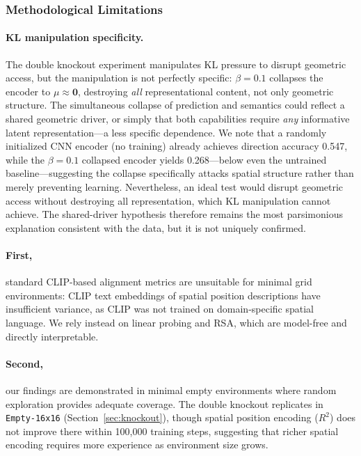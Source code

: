 \documentclass{article}
\begin{document}
\subsubsection*{Methodological Limitations}

\paragraph{KL manipulation specificity.}
The double knockout experiment manipulates KL pressure to disrupt
geometric access, but the manipulation is not perfectly specific:
$\beta=0.1$ collapses the encoder to $\mu\!\approx\!\mathbf{0}$,
destroying \emph{all} representational content, not only geometric structure.
The simultaneous collapse of prediction and semantics could reflect
a shared geometric driver, or simply that both capabilities require
\emph{any} informative latent representation---a less specific dependence.
We note that a randomly initialized CNN encoder (no training) already
achieves direction accuracy 0.547, while the $\beta=0.1$ collapsed
encoder yields 0.268---below even the untrained baseline---suggesting
the collapse specifically attacks spatial structure rather than
merely preventing learning.
Nevertheless, an ideal test would disrupt geometric access without
destroying all representation, which KL manipulation cannot achieve.
The shared-driver hypothesis therefore remains the most parsimonious
explanation consistent with the data, but it is not uniquely confirmed.

\paragraph{First,} standard CLIP-based alignment metrics are unsuitable for minimal
grid environments: CLIP text embeddings of spatial position descriptions
have insufficient variance, as CLIP was not trained on
domain-specific spatial language.
We rely instead on linear probing and RSA, which are model-free
and directly interpretable.

\paragraph{Second,} our findings are demonstrated in minimal empty environments
where random exploration provides adequate coverage.
The double knockout replicates in \texttt{Empty-16x16}
(Section~\ref{sec:knockout}), though spatial position encoding
($R^2$) does not improve there within 100{,}000 training steps,
suggesting that richer spatial encoding requires more experience
as environment size grows.
\end{document}
